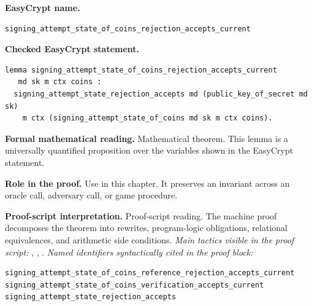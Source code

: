 \begin{formaltheorem}
\noindent\textbf{EasyCrypt name.}
\begin{lstlisting}[language=EasyCrypt,basicstyle=\ttfamily\scriptsize]
signing_attempt_state_of_coins_rejection_accepts_current
\end{lstlisting}
\noindent\textbf{Checked EasyCrypt statement.}
\begin{lstlisting}[language=EasyCrypt,basicstyle=\ttfamily\scriptsize]
lemma signing_attempt_state_of_coins_rejection_accepts_current
   md sk m ctx coins :
  signing_attempt_state_rejection_accepts md (public_key_of_secret md sk)
    m ctx (signing_attempt_state_of_coins md sk m ctx coins).
\end{lstlisting}
\noindent\textbf{Formal mathematical reading.}
Mathematical theorem. This lemma is a universally quantified proposition over the variables shown in the EasyCrypt statement.

\noindent\textbf{Role in the proof.}
Use in this chapter. It preserves an invariant across an oracle call, adversary call, or game procedure.

\noindent\textbf{Proof-script interpretation.}
Proof-script reading. The machine proof decomposes the theorem into rewrites, program-logic obligations, relational equivalences, and arithmetic side conditions.
\emph{Main tactics visible in the proof script:} , , .
\emph{Named identifiers syntactically cited in the proof block:}
\begin{lstlisting}[language=EasyCrypt,basicstyle=\ttfamily\scriptsize]
signing_attempt_state_of_coins_reference_rejection_accepts_current
signing_attempt_state_of_coins_verification_accepts_current
signing_attempt_state_rejection_accepts
\end{lstlisting}

\end{formaltheorem}

